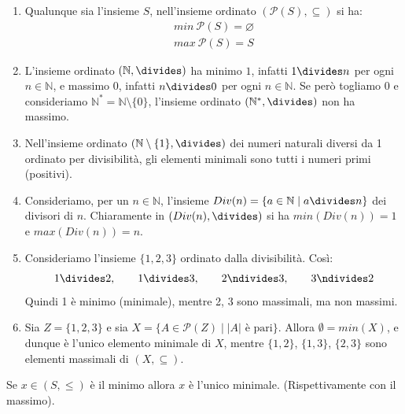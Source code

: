 \begin{example}
	\begin{enumerate}
		\item Qualunque sia l'insieme $S$, nell'insieme ordinato $(\mathcal{P}(S), \subseteq)$ si ha:
		\begin{displaymath}
			\begin{array}{c}
				min \ \mathcal{P}(S) = \varnothing \\
				max \ \mathcal{P}(S) = S
			\end{array}
		\end{displaymath}
		
		\item L'insieme ordinato $(\mathbb{N}, \divides)$ ha minimo $1$, infatti $1 \divides n$ per ogni $n \in \mathbb{N}$, e massimo $0$, infatti $n \divides 0$ per ogni $n \in \mathbb{N}$. Se però togliamo $0$ e consideriamo $\mathbb{N}^{*}= \mathbb{N}\setminus\{0\}$, l'insieme ordinato $(\mathbb{N}^{*}, \divides)$ non ha massimo.
		\item Nell’insieme ordinato $ (\mathbb{N}\setminus \{1\}, \divides)$ dei numeri naturali diversi da 1 ordinato per divisibilità, gli elementi minimali sono tutti i numeri primi (positivi).
		\item Consideriamo, per un $n \in \mathbb{N}$, l'insieme $Div(n)=\{a \in \mathbb{N} \; | \; a \divides n\}$ dei divisori di $n$. Chiaramente in $(Div(n),\divides)$ si ha $min(Div(n))=1$ e $max(Div(n))=n$.
		
		\item Consideriamo l'insieme $\{1,2,3\}$ ordinato dalla divisibilità. Così:
	\begin{displaymath}
		1 \divides 2, \qquad 1 \divides 3, \qquad 2 \ndivides 3, \qquad 3 \ndivides 2
	\end{displaymath}
		Quindi 1 è minimo (minimale), mentre 2, 3 sono massimali, ma non massimi.
		\item Sia $Z=\{1,2,3\}$ e sia $X = \{A \in \mathcal{P}(Z) \; | \; |A| \text{ è pari}\}$. Allora $\emptyset = min(X)$, e dunque è l'unico elemento minimale di $X$, mentre $\{1,2\}$, $\{1,3\}$, $\{2,3\}$ sono elementi massimali di $(X,\subseteq)$.
	\end{enumerate}
\end{example}

\begin{propbox}
	Se $x \in (S,\leq)$ è il minimo allora $x$ è l'unico minimale. (Rispettivamente con il massimo).
\end{propbox}

